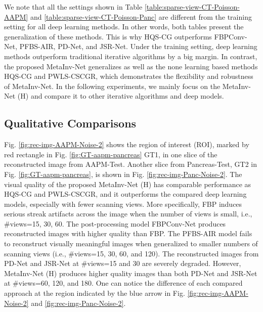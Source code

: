 \documentclass[journal,twoside]{IEEEtran}
\begin{document}
We note that all the settings shown in Table \ref{table:sparse-view-CT-Poisson-AAPM} and \ref{table:sparse-view-CT-Poisson-Panc} are different from the training setting for all deep learning methods. In other words, both tables present the generalization of these methods. This is why HQS-CG outperforms FBPConv-Net, PFBS-AIR, PD-Net, and JSR-Net. Under the training setting, deep learning methods outperform traditional iterative algorithms by a big margin. In contrast, the proposed MetaInv-Net generalizes as well as the none learning based methods HQS-CG and PWLS-CSCGR, which demonstrates the flexibility and robustness of MetaInv-Net. In the following experiments, we mainly focus on the MetaInv-Net (H) and compare it to other iterative algorithms and deep models.


\subsection{Qualitative Comparisons}
Fig. \ref{fig:rec-img-AAPM-Noise-2} shows the region of interest (ROI), marked by red rectangle in Fig. \ref{fig:GT-aapm-pancreas} GT1, in one slice of the reconstructed image from AAPM-Test. Another slice from Pancreas-Test, GT2 in Fig. \ref{fig:GT-aapm-pancreas}, is shown in Fig. \ref{fig:rec-img-Panc-Noise-2}. The visual quality of the proposed MetaInv-Net (H) has comparable performance as HQS-CG and PWLS-CSCGR, and it outperforms the compared deep learning models, especially with fewer scanning views. More specifically, FBP induces serious streak artifacts across the image when the number of views is small, i.e., \#views=15, 30, 60. The post-processing model FBPConv-Net produces reconstructed images with higher quality than FBP. The PFBS-AIR model fails to reconstruct visually meaningful images when generalized to smaller numbers of scanning views (i.e., \#views=15, 30, 60, and 120). The reconstructed images from PD-Net and JSR-Net at \#views=15 and 30 are severely degraded. However, MetaInv-Net (H) produces higher quality images than both PD-Net and JSR-Net at \#views=60, 120, and 180. One can notice the difference of each compared approach at the region indicated by the blue arrow in Fig. \ref{fig:rec-img-AAPM-Noise-2} and \ref{fig:rec-img-Panc-Noise-2}.
\end{document}
